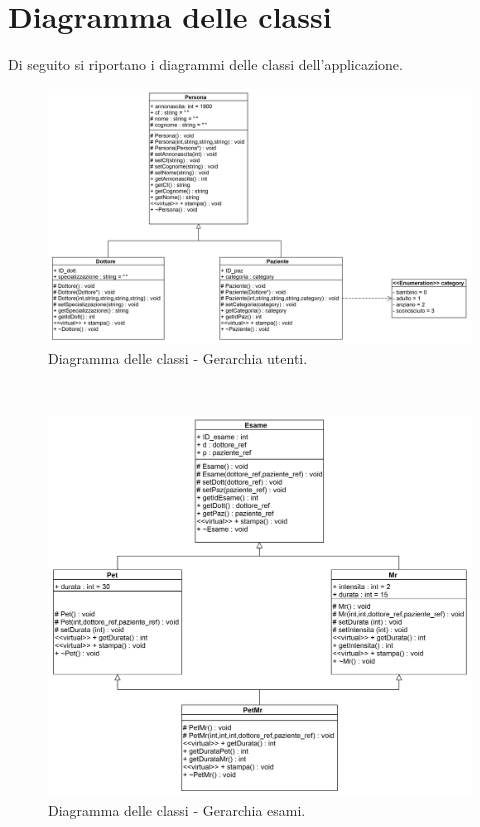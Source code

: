 \documentclass[a4paper,12pt]{article}
\begin{document}
\section*{Diagramma delle classi}
Di seguito si riportano i diagrammi delle classi dell’applicazione. 
\begin{figure}[h]
 \centering
 \includegraphics[width=\columnwidth]{diagrammiClassi/gerarchiaPersone}
 \caption{Diagramma delle classi - Gerarchia utenti.}
\end{figure}
\\
\begin{figure}[h]
 \centering
 \includegraphics[width=\columnwidth]{diagrammiClassi/gerarchiaEsami}
 \caption{Diagramma delle classi - Gerarchia esami.}
\end{figure}
\end{document}
